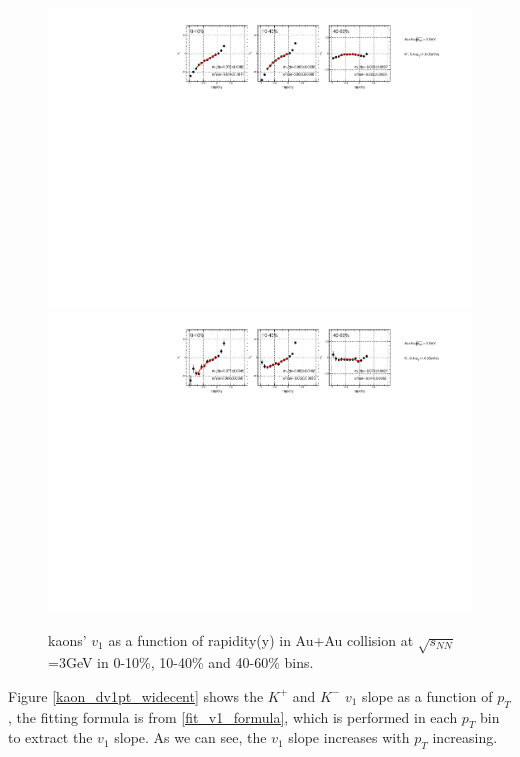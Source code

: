 \begin{figure}[h]
\includegraphics[scale=0.8]{chapter3/fig/v1ypikp/kaonp_v1y_wide_cent.pdf}
\includegraphics[scale=0.8]{chapter3/fig/v1ypikp/kaonm_v1y_wide_cent.pdf}
\caption{\label{kaon_v1y_widecent} kaons' $v_{1}$ as a function of rapidity(y) in Au+Au collision at $\sqrt{s_{NN}}$=3GeV in 0-10\%, 10-40\% and 40-60\% bins.}
\end{figure}

\clearpage

Figure \ref{kaon_dv1pt_widecent} shows the  $K^{+}$ and $K^{-}$ $v_{1}$ slope as a function of $p_{T}$, the fitting formula is from \ref{fit_v1_formula}, which is performed in each $p_{T}$ bin to extract the $v_{1}$ slope. As we can see, the $v_{1}$ slope increases with $p_{T}$ increasing.

